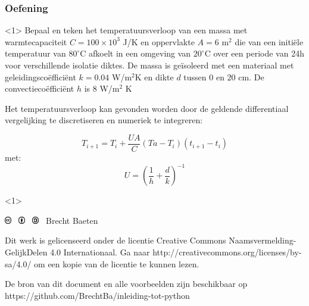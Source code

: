 \documentclass[t]{beamer}
\begin{document}
\begin{frame}
	\frametitle{Oefening}
	\begin{onlyenv}
	Bepaal en teken het temperatuursverloop van een massa met warmtecapaciteit $C=100 \times 10^3$ J/K en oppervlakte $A = 6$ m$^2$ die van een initiële temperatuur van $80^\circ$C afkoelt in een omgeving van $20^\circ$C over een periode van 24h voor verschillende isolatie diktes. De massa is geïsoleerd met een materiaal met geleidingscoëfficiënt $k = 0.04$ W/m$^2$K en dikte $d$ tussen $0$ en $20$ cm. De convectiecoëfficiënt $h$ is $8$ W/m$^2$ K

	\vspace{0.5cm}
Het temperatuursverloop kan gevonden worden door de geldende differentiaal vergelijking te discretiseren en numeriek te integreren:

\begin{equation}
	T_{i+1} = T_{i} + \frac{U A}{C} (Ta-T_{i}) (t_{i+1}-t_{i})
\end{equation}	
met:
\begin{equation}
	U = \left(\frac{1}{h} + \frac{d}{k} \right)^{-1}
\end{equation}
	
	\end{onlyenv}
	\begin{onlyenv}
		
	\end{onlyenv}
\end{frame}  	
\begin{frame}
	\footnotesize
	\vspace{4cm}
	\includegraphics[height=0.3cm]{fig/cc} \
	\includegraphics[height=0.3cm]{fig/by} \
	\includegraphics[height=0.3cm]{fig/sa}
	\quad \the\year\ Brecht Baeten
	\vspace{0.5cm}
	
    Dit werk is gelicenseerd onder de licentie Creative Commons Naamsvermelding-GelijkDelen 4.0 Internationaal. Ga naar http://creativecommons.org/licenses/by-sa/4.0/ om een kopie van de licentie te kunnen lezen.
    	
    \vspace{0.5cm}
    De bron van dit document en alle voorbeelden zijn beschikbaar op https://github.com/BrechtBa/inleiding-tot-python
\end{frame}
\end{document}
